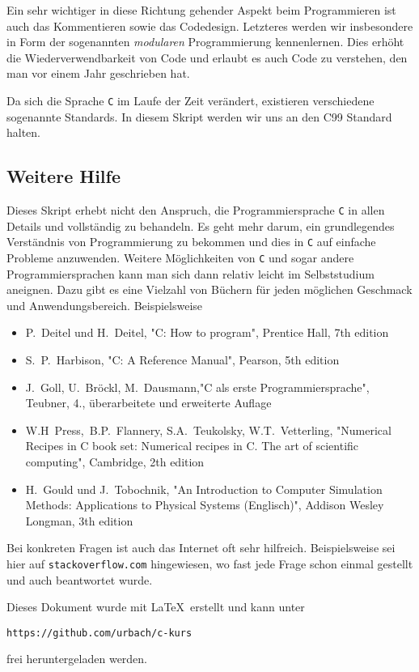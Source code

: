 Ein sehr wichtiger in diese Richtung gehender Aspekt beim Programmieren ist auch das Kommentieren sowie das Code\-design.
Letzteres werden wir insbesondere in Form der sogenannten \emph{modularen} Programmierung kennenlernen.
Dies erhöht die Wiederverwendbarkeit von Code und erlaubt es auch Code zu verstehen, den man vor einem Jahr geschrieben hat.

Da sich die Sprache \texttt{C} im Laufe der Zeit verändert, existieren verschiedene sogenannte Standards.
In diesem Skript werden wir uns an den C99 Standard halten.

\subsection{Weitere Hilfe}

Dieses Skript erhebt nicht den Anspruch, die Programmiersprache \texttt{C} in allen Details und vollständig zu behandeln.
Es geht mehr darum, ein grundlegendes Verständnis von Programmierung zu bekommen und dies in \texttt{C} auf einfache Probleme anzuwenden.
Weitere Möglichkeiten von \texttt{C} und sogar andere Programmiersprachen kann man sich dann relativ leicht im Selbststudium aneignen.
Dazu gibt es eine Vielzahl von Büchern für jeden möglichen Geschmack und Anwendungsbereich.
Beispielsweise
\begin{itemize}
\item P.~Deitel und H.~Deitel, "C: How to program", Prentice Hall, 7th edition
\item S.~P.~Harbison, "C: A Reference Manual", Pearson, 5th edition
\item J.~Goll, U.~Bröckl, M.~Dausmann,"C als erste Programmiersprache", Teubner, 4., überarbeitete und erweiterte Auflage
\item W.H~Press,~B.P.~Flannery, S.A.~Teukolsky, W.T.~Vetterling, "Numerical Recipes in C book set: Numerical recipes in C. The art of scientific computing", Cambridge, 2th edition
\item H.~Gould und J.~Tobochnik, "{}An Introduction to Computer Simulation Methods: Applications to Physical Systems (Englisch)", Addison Wesley Longman, 3th edition
\end{itemize}
Bei konkreten Fragen ist auch das Internet oft sehr hilfreich.
Beispielsweise sei hier auf \texttt{stackoverflow.com} hingewiesen, wo fast jede Frage schon einmal gestellt und auch beantwortet wurde.

Dieses Dokument wurde mit \LaTeX\ erstellt und kann unter 
\begin{center}
  \texttt{https://github.com/urbach/c-kurs} 
\end{center}
frei heruntergeladen werden.
